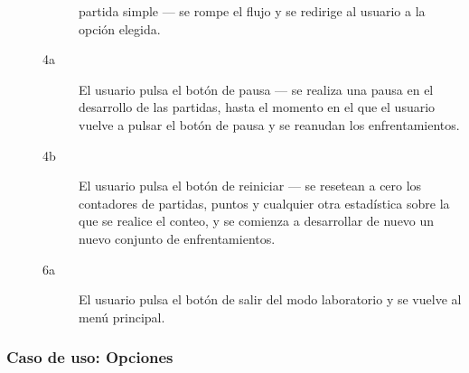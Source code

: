 \begin{description}
\begin{description}
                    partida simple --- se rompe el flujo y se redirige al usuario a la opción elegida.
            \item[4a ] El usuario pulsa el botón de pausa --- se realiza una pausa en el desarrollo de las
                    partidas, hasta el momento en el que el usuario vuelve a pulsar el botón de pausa y se
                    reanudan los enfrentamientos.
            \item[4b ] El usuario pulsa el botón de reiniciar --- se resetean a cero los contadores de partidas,
                    puntos y cualquier otra estadística sobre la que se realice el conteo, y se comienza a
                    desarrollar de nuevo un nuevo conjunto de enfrentamientos.
            \item[6a ] El usuario pulsa el botón de salir del modo laboratorio y se vuelve al menú principal.
        \end{description}
\end{description}

\subsubsection{Caso de uso: Opciones}

